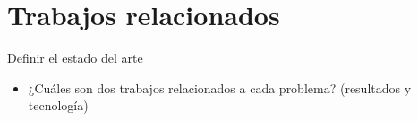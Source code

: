 \section{Trabajos relacionados}

\begin{tcolorbox}[colback=yellow!10!white,colframe=red!75!black,title=Recomendaciones]
  Definir el estado del arte
  \begin{itemize}
      \item ¿Cuáles son dos trabajos relacionados a cada problema? (resultados y tecnología)
  \end{itemize}
\end{tcolorbox}

\pagebreak